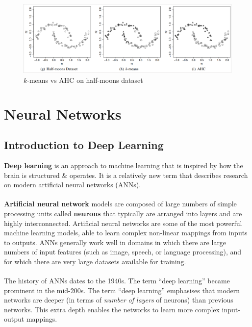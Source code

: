 \documentclass[a4paper,11pt]{article}
\begin{document}
\begin{figure}[H]
    \centering
    \includegraphics[width=\textwidth]{images/halfmoons.png}
    \caption{ $k$-means vs AHC on half-moons dataset }
\end{figure}

\section{Neural Networks}
\subsection{Introduction to Deep Learning}
\textbf{Deep learning} is an approach to machine learning that is inspired by how the brain is structured \& operates.
It is a relatively new term that describes research on modern artificial neural networks (ANNs).
\\\\
\textbf{Artificial neural network} models are composed of large numbers of simple processing units called \textbf{neurons}  that typically are arranged into layers and are highly interconnected.
Artificial neural networks are some of the most powerful machine learning models, able to learn complex non-linear mappings from inputs to outputs.
ANNs generally work well in domains in which there are large numbers of input features (such as image, speech, or language processing), and for which there are very large datasets available for training.
\\\\
The history of ANNs dates to the 1940s.
The term ``deep learning'' became prominent in the mid-200s.
The term ``deep learning'' emphasises that modern networks are deeper (in terms of \textit{number of layers} of neurons) than previous networks.
This extra depth enables the networks to learn more complex input-output mappings.
\end{document}
